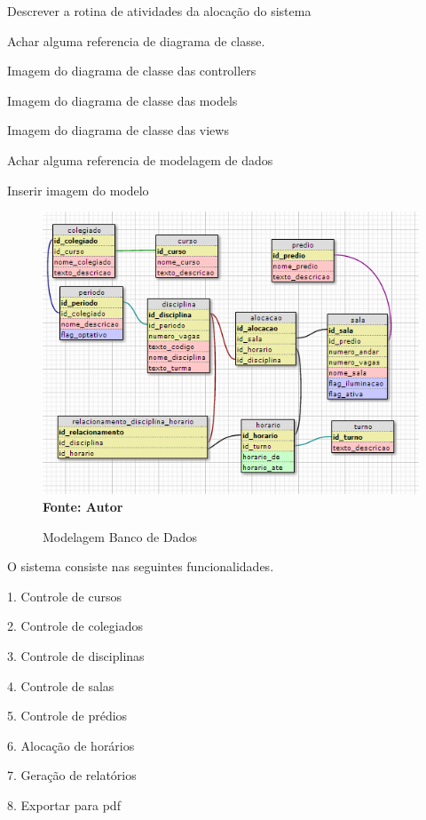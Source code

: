 	
	Descrever a rotina de atividades da alocação do sistema
	

		
	Achar alguma referencia de diagrama de classe.

	Imagem do diagrama de classe das controllers

	
	Imagem do diagrama de classe das models

	
	Imagem do diagrama de classe das views


	Achar alguma referencia de modelagem de dados

	Inserir imagem do modelo

		\begin{figure}[!htb]
   		\caption[Modelagem Banco de Dados]{Modelagem Banco de Dados}
   		\label{fig:figura3}
   		\centering
   		\includegraphics{modelagemBanco.png}
   		\\ \textbf{\footnotesize Fonte: Autor}
	\end{figure}


	O sistema consiste nas seguintes funcionalidades.

	1. Controle de cursos \par
	2. Controle de colegiados\par
	3. Controle de disciplinas\par
	4. Controle de salas\par
	5. Controle de prédios\par
	6. Alocação de horários\par
	7. Geração de relatórios\par
	8. Exportar para pdf\par



